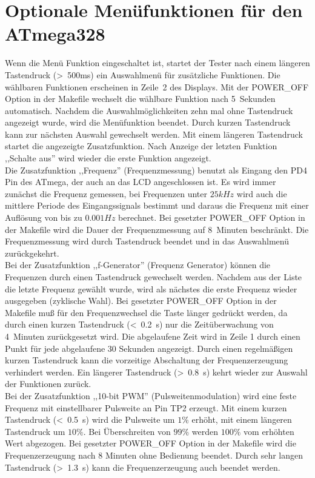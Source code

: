 \section{Optionale Menüfunktionen für den ATmega328}
Wenn die Menü Funktion eingeschaltet ist, startet der Tester nach einem längeren Tastendruck (\textgreater~500ms) ein Auswahlmenü
für zusätzliche Funktionen.
Die wählbaren Funktionen erscheinen in Zeile~2 des Displays.
Mit der POWER\_OFF Option in der Makefile wechselt die wählbare Funktion nach 5~Sekunden automatisch.
Nachdem die Auswahlmöglichkeiten zehn mal ohne Tastendruck angezeigt wurde, wird die Menüfunktion beendet.
Durch kurzen Tastendruck kann zur nächsten Auswahl gewechselt werden.
Mit einem längeren Tastendruck startet die angezeigte Zusatzfunktion.
Nach Anzeige der letzten Funktion ,,Schalte aus'' wird wieder die erste Funktion angezeigt.\\

Die Zusatzfunktion ,,Frequenz'' (Frequenzmessung) benutzt als Eingang den PD4 Pin des ATmega, der auch an das LCD angeschlossen ist.
Es wird immer zunächst die Frequenz gemessen, bei Frequenzen unter \(25 kHz\) wird auch die mittlere Periode des Eingangssignals
bestimmt und daraus die Frequenz mit einer Auflösung von bis zu \(0.001 Hz\) berechnet.
Bei gesetzter POWER\_OFF Option in der Makefile wird die Dauer der Frequenzmessung auf 8~Minuten beschränkt.
Die Frequenzmessung wird durch Tastendruck beendet und in das Auswahlmenü zurückgekehrt.\\

Bei der Zusatzfunktion ,,f-Generator'' (Frequenz Generator) können die Frequenzen durch einen Tastendruck 
 gewechselt werden.
Nachdem aus der Liste die letzte Frequenz gewählt wurde, wird als nächstes die erste Frequenz
 wieder ausgegeben (zyklische Wahl).
Bei gesetzter POWER\_OFF Option in der Makefile muß für den Frequenzwechsel die Taste länger gedrückt werden, da
durch einen kurzen Tastendruck (\textless~0.2~s) nur die Zeitüberwachung von 4~Minuten zurückgesetzt wird.
Die abgelaufene Zeit wird in Zeile 1 durch einen Punkt für jede abgelaufene 30 Sekunden angezeigt.
Durch einen regelmäßigen kurzen Tastendruck kann die vorzeitige Abschaltung der Frequenzerzeugung verhindert werden.
Ein längerer Tastendruck (\textgreater~0.8~s) kehrt wieder zur Auswahl der Funktionen zurück.\\

Bei der Zusatzfunktion ,,10-bit PWM'' (Pulsweitenmodulation) wird eine feste Frequenz mit einstellbarer Pulsweite an Pin TP2 erzeugt.
Mit einem kurzen Tastendruck (\textless~0.5~s) wird die Pulsweite um \(1 \%\) erhöht, mit einem längeren Tastendruck um \(10 \%\).
Bei Überschreiten von \(99 \%\) werden \(100 \%\) vom erhöhten Wert abgezogen.
Bei gesetzter POWER\_OFF Option in der Makefile wird die Frequenzerzeugung nach 8 Minuten ohne Bedienung beendet.
Durch sehr langen Tastendruck (\textgreater~1.3~s) kann die Frequenzerzeugung auch beendet werden.\\

